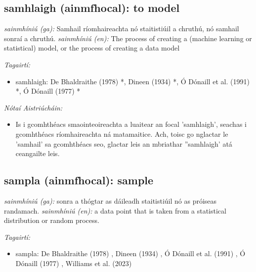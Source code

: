 \documentclass{article}
\begin{document}
\subsection*{samhlaigh (ainmfhocal): to model} 
 \noindent \textit{sainmhíniú (ga):} Samhail ríomhaireachta nó staitistiúil a chruthú, nó samhail sonraí a chruthú.
\newline\newline
 \noindent \textit{sainmhíniú (en):} The process of creating a (machine learning or statistical) model, or the process of creating a data model
\newline

 \noindent \textit{Tagairtí:}
\begin{itemize}
	\item samhlaigh: De Bhaldraithe (1978) \cite{de-bhaldraithe}*, Dineen (1934) \cite{dineen}*, Ó Dónaill et al. (1991) \cite{focloir-beag}*, Ó Dónaill (1977) \cite{odonaill}*
\end{itemize}

 \noindent \textit{Nótaí Aistriúcháin:}
\begin{itemize}
	\item Is i gcomhthéacs smaointeoireachta a luaitear an focal 'samhlaigh', seachas i gcomhthéacs ríomhaireachta ná matamaitice. Ach, toisc go nglactar le 'samhail' sa gcomhthéacs seo, glactar leis an mbriathar ''samhlaigh' atá ceangailte leis.
\end{itemize}


\subsection*{sampla (ainmfhocal): sample} 
 \noindent \textit{sainmhíniú (ga):} sonra a thógtar as dáileadh staitistiúil nó as próiseas randamach.
\newline\newline
 \noindent \textit{sainmhíniú (en):} a data point that is taken from a statistical distribution or random process.
\newline

 \noindent \textit{Tagairtí:}
\begin{itemize}
	\item sampla: De Bhaldraithe (1978) \cite{de-bhaldraithe}, Dineen (1934) \cite{dineen}, Ó Dónaill et al. (1991) \cite{focloir-beag}, Ó Dónaill (1977) \cite{odonaill}, Williams et al. (2023) \cite{storchiste}
\end{itemize}
\end{document}

